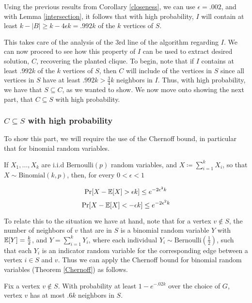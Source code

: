 \documentclass{article}
\begin{document}
Using the previous results from Corollary \ref{closeness}, we can use
$\epsilon = .002$, and with Lemma \ref{intersection}, it follows that with
high probability, $I$
will contain at least $k - |B| \geq k - 4 \epsilon k = .992k$ of the $k$
vertices of $S$.

This takes care of the analysis of the 3rd line of the
algorithm regarding $I$. We can now proceed to see how this property of $I$ can be
used to extract desired solution, $C$, recovering the planted clique. To begin,
note that if $I$ contains at least $.992k$ of the $k$ vertices of $S$, then $C$
will include of the vertices in $S$ since all vertices in $S$ have at least
$.992k > \frac{3}{4}k$ neighbors in $I$. Thus, with high probability, we have
that $S
\subseteq C$, as we wanted to show. We now move onto showing the next part,
that $C \subseteq S$ with high probability.

\subsubsection{$C \subseteq S$ with high probability}
To show this part, we will require the use of the Chernoff bound, in
particular that for binomial random variables.

\begin{theorem}
    \label{Chernoff}
    If $X_{1}, \ldots, X_{k}$ are i.i.d $\text{Bernoulli}(p)$ random variables,
    and $X \coloneqq \sum_{i = 1}^{k} X_{i}$, so that $X \sim
    \text{Binomial}(k, p)$, then, for every $0 < \epsilon < 1$

    $$\Pr[X - \operatorname{\mathbb{E}}[X] > \epsilon k] \leq e^{-2 \epsilon^{2} k}$$
    $$\Pr[X - \operatorname{\mathbb{E}}[X] < -\epsilon k] \leq e^{-2 \epsilon^{2} k}$$
\end{theorem}

To relate this to the situation we have at hand, note that for a vertex $v \notin S$,
the number of neighbors of $v$ that are in $S$ is a binomial random variable $Y$ with
$\operatorname{\mathbb{E}}[Y] = \frac{k}{2}$, and $Y = \sum_{i = 1}^{k} Y_{i}$, where each individual
$Y_{i} \sim \text{Bernoulli}\left(\frac{1}{2}\right)$, such that each $Y_{i}$
is an indicator random variable for the corresponding edge between a vertex $i
\in S$ and $v$. Thus we can apply the Chernoff bound for binomial random
variables (Theorem \ref{Chernoff}) as follows.

\begin{corollary}
    \label{chernoff neighbors}
    Fix a vertex $v \notin S$. With probability at least $1 - e^{-.02k}$ over
    the choice of $G$, vertex $v$ has at most $.6k$ neighbors in $S$.
\end{corollary}
\end{document}
